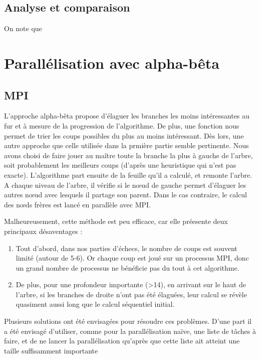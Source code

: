 \documentclass[12pt]{article}
\begin{document}
    \subsection{Analyse et comparaison}
    On note que

\section{Parallélisation avec alpha-bêta}
    \subsection{MPI}
    L'approche alpha-bêta propose d'élaguer les branches
    les moins intéressantes au fur et à mesure de la progression de 
    l'algorithme. De plus, une fonction nous permet de trier les coups
    possibles du plus au moins intéressant. Dès lors, une autre 
    approche que celle utilisée dans la prmière partie semble pertinente.
    Nous avons choisi de faire jouer au
    maître toute la branche la plus à gauche de l'arbre, soit
    probablement les meilleurs coups (d'après une heuristique qui n'est pas 
    exacte). L'algorithme part ensuite de la feuille qu'il a calculé, et
    remonte l'arbre. A chaque niveau de l'arbre, il vérifie si le n\oe ud de 
    gauche permet d'élaguer les autres n\oe ud avec lesquels il partage
    son parent. Dans le cas contraire, le calcul des \og n\oe ds frères \fg
    est lancé en parallèle avec MPI.\\
    \par Malheureusement, cette méthode est peu efficace, car elle préesente
    deux principaux désaventages :
    \begin{enumerate}
        \item Tout d'abord, dans nos parties d'échecs, le nombre
    de coups est souvent limité (autour de 5-6). Or chaque coup est joué sur un
    processus MPI, donc un grand nombre de processus ne bénéficie pas du tout
    à cet algorithme.
        \item De plus, pour une profondeur importante (>14),
    en arrivant sur le haut de l'arbre, si les branches de droite n'ont pas
    été élaguées, leur calcul se révèle quasiment aussi long que le calcul
    séquentiel initial. 
    \end{enumerate}
    Plusieurs solutions ont été envisagées pour résoudre ces problèmes.
    D'une part il a été envisagé d'utiliser, comme pour la parallélisation
    naïve, une liste de tâches à faire, et de ne lancer la parallélisation
    qu'après que cette liste ait atteint une taille suffisamment importante
\end{document}
